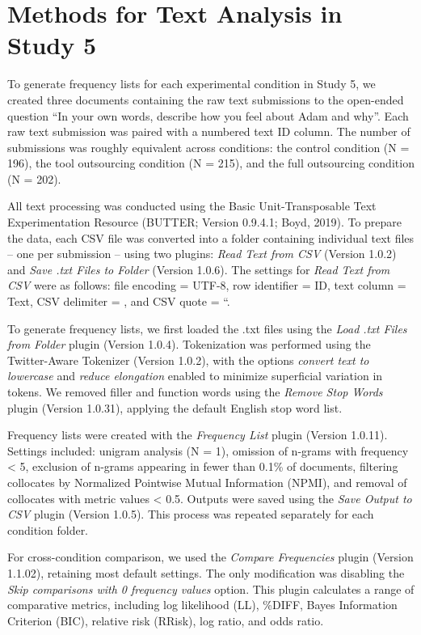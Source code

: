\documentclass[
  man,
  floatsintext,
  longtable,
  nolmodern,
  notxfonts,
  notimes,
  colorlinks=true,linkcolor=blue,citecolor=blue,urlcolor=blue]{apa7}
\begin{document}
\newpage

\section{Methods for Text Analysis in Study
5}\label{methods-for-text-analysis-in-study-5}

To generate frequency lists for each experimental condition in Study 5,
we created three documents containing the raw text submissions to the
open-ended question ``In your own words, describe how you feel about
Adam and why''. Each raw text submission was paired with a numbered text
ID column. The number of submissions was roughly equivalent across
conditions: the control condition (N = 196), the tool outsourcing
condition (N = 215), and the full outsourcing condition (N = 202).

All text processing was conducted using the Basic Unit-Transposable Text
Experimentation Resource (BUTTER; Version 0.9.4.1; Boyd, 2019). To
prepare the data, each CSV file was converted into a folder containing
individual text files -- one per submission -- using two plugins:
\emph{Read Text from CSV} (Version 1.0.2) and \emph{Save .txt Files to
Folder} (Version 1.0.6). The settings for \emph{Read Text from CSV} were
as follows: file encoding = UTF-8, row identifier = ID, text column =
Text, CSV delimiter = , and CSV quote = ``.

To generate frequency lists, we first loaded the .txt files using the
\emph{Load .txt Files from Folder} plugin (Version 1.0.4). Tokenization
was performed using the Twitter-Aware Tokenizer (Version 1.0.2), with
the options \emph{convert text to lowercase} and \emph{reduce
elongation} enabled to minimize superficial variation in tokens. We
removed filler and function words using the \emph{Remove Stop Words}
plugin (Version 1.0.31), applying the default English stop word list.

Frequency lists were created with the \emph{Frequency List} plugin
(Version 1.0.11). Settings included: unigram analysis (N = 1), omission
of n-grams with frequency \textless{} 5, exclusion of n-grams appearing
in fewer than 0.1\% of documents, filtering collocates by Normalized
Pointwise Mutual Information (NPMI), and removal of collocates with
metric values \textless{} 0.5. Outputs were saved using the \emph{Save
Output to CSV} plugin (Version 1.0.5). This process was repeated
separately for each condition folder.

For cross-condition comparison, we used the \emph{Compare Frequencies}
plugin (Version 1.1.02), retaining most default settings. The only
modification was disabling the \emph{Skip comparisons with 0 frequency
values} option. This plugin calculates a range of comparative metrics,
including log likelihood (LL), \%DIFF, Bayes Information Criterion
(BIC), relative risk (RRisk), log ratio, and odds ratio.
\end{document}
